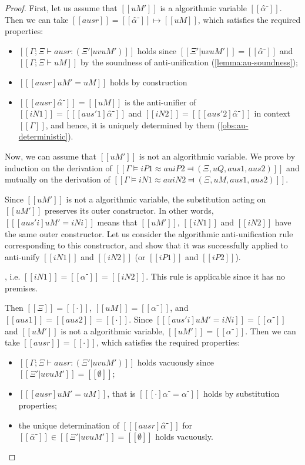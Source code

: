 \lemmaAuInitial*
\begin{proof}
    First, let us assume that $[[uM']]$ is a algorithmic variable $[[α̂⁻]]$. 
    Then we can take $[[ausr]] = [[α̂⁻]] \mapsto [[uM]]$, which satisfies the required properties:
    \begin{itemize}
        \item $[[Γ ; Ξ ⊢ ausr : (Ξ' | uv uM')]]$ holds since 
        $[[Ξ' | uv uM']] = [[{α̂⁻}]]$ and $[[Γ ; Ξ ⊢ uM]]$ by the soundness of anti-unification (\cref{lemma:au-soundness});
        \item $[[ [ausr] uM' = uM ]]$ holds by construction
        \item $[[ [ausr]α̂⁻]] = [[uM]]$ is the anti-unifier of 
            $[[iN1]] = [[ [aus'1] α̂⁻]]$ and $[[iN2]] = [[ [aus'2] α̂⁻]]$
            in context $[[Γ]]$, and hence, it is uniquely determined by them (\cref{obs:au-deterministic}).
    \end{itemize}

    Now, we can assume that $[[uM']]$ is not an algorithmic variable. 
    We prove by induction on the derivation of $[[Γ ⊨ iP1 ≈au iP2 ⫤ (Ξ, uQ, aus1, aus2)]]$
    and mutually on the derivation of $[[Γ ⊨ iN1 ≈au iN2 ⫤ (Ξ, uM, aus1, aus2)]]$.

    Since $[[uM']]$ is not a algorithmic variable, 
    the substitution acting on $[[uM']]$ preserves its outer constructor. 
    In other words, 
    $[[ [aus'i] uM' = iNi ]]$ means that $[[uM']]$, 
    $[[iN1]]$ and $[[iN2]]$ have the same outer constructor. 
    Let us consider the algorithmic anti-unification rule corresponding to this constructor, 
    and show that it was successfully applied to anti-unify $[[iN1]]$ and $[[iN2]]$ 
    (or $[[iP1]]$ and $[[iP2]]$).

    \begin{caseof}
        \item {}, i.e. $[[iN1]] = [[α⁻]] = [[iN2]]$.
        \label{case:anti-unification-initial:nvar}
        This rule is applicable since it has no premises. 
        
        Then $[[Ξ]] = [[·]]$, $[[uM]] = [[α⁻]]$, 
        and $[[aus1]] = [[aus2]] = [[·]]$.
        Since $[[ [aus'i] uM' = iNi ]] = [[α⁻]]$
        and $[[uM']]$ is not a algorithmic variable, $[[uM']] = [[α⁻]]$.
        Then we can take $[[ausr]] = [[·]]$, which satisfies the required properties:
        \begin{itemize}
            \item $[[Γ ; Ξ ⊢ ausr : (Ξ' | uv uM')]]$ holds vacuously since 
            $[[Ξ' | uv uM']] = [[∅]]$; 
            \item $[[ [ausr] uM' = uM ]]$, that is $[[ [·] α⁻ = α⁻ ]]$
            holds by substitution properties;
            \item the unique determination of $[[ [ausr]α̂⁻]]$ for $[[α̂⁻]] \in [[Ξ' | uv uM']] = [[∅]]$ holds vacuously.
        \end{itemize}


\end{caseof}
\end{proof}
